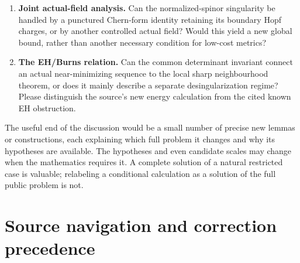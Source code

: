 \documentclass[11pt]{article}
\theoremstyle{remark}
\begin{document}
\begin{enumerate}
component? Neither the corrected symbol count nor a recycled cup-square
identity supplies this.
\item \textbf{Joint actual-field analysis.}
Can the normalized-spinor singularity be handled by a punctured Chern-form
identity retaining its boundary Hopf charges, or by another controlled
actual field? Would this yield a new global bound, rather than another
necessary condition for low-cost metrics?
\item \textbf{The EH/Burns relation.}
Can the common determinant invariant connect an actual near-minimizing
sequence to the local sharp neighbourhood theorem, or does it mainly
describe a separate desingularization regime? Please distinguish the
source's new energy calculation from the cited known EH obstruction.
\end{enumerate}

The useful end of the discussion would be a small number of precise new
lemmas or constructions, each explaining which full problem it changes and
why its hypotheses are available. The hypotheses and even candidate scales
may change when the mathematics requires it. A complete solution of a
natural restricted case is valuable; relabeling a conditional calculation as
a solution of the full public problem is not.

\appendix
\section{Source navigation and correction precedence}
\end{document}
